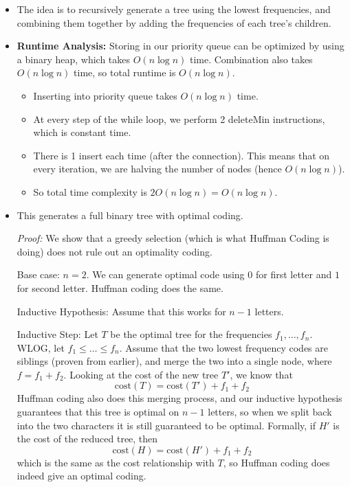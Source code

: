 	\begin{itemize}
		\item The idea is to recursively generate a tree using the lowest frequencies, and combining them 
			together by adding the frequencies of each tree's children. 
		\item \textbf{Runtime Analysis:} Storing in our priority queue can be optimized by using a binary heap, 
			which takes $O(n \log n)$ time. Combination also takes $O(n \log n)$ time, so total runtime
			 is $O(n \log n)$.
			\begin{itemize}
				\item Inserting into priority queue takes $O(n \log n)$ time. 
				\item At every step of the while loop, we perform 2 deleteMin instructions, which is constant
					time.
				\item There is 1 insert each time (after the connection). This means that on every 
					iteration, we are halving the number of nodes (hence $O(n \log n)$). 
				\item So total time complexity is $2O(n \log n) = O(n \log n)$.
			\end{itemize}
		 \item This generates a full binary tree with optimal coding. 

			 \textit{Proof:} We show that a greedy selection (which is what Huffman Coding is doing) does not 
			 rule out an optimality coding.

			Base case: $n = 2$. We can generate optimal code using $0$ for first letter and $1$ for 
			second letter. Huffman coding does the same.

			Inductive Hypothesis: Assume that this works for $n-1$ letters.

			Inductive Step: Let $T$ be the optimal tree for the frequencies $f_1, \dots, f_n$. WLOG, let 
			$f_1 \le \dots \le f_n$. Assume that the two lowest frequency codes are siblings (proven 
			from earlier), and merge the two into a single node, where $f = f_1 + f_2$. Looking at the cost 
			of the new tree $T'$, we know that 
			\[
				\mathrm{cost}(T) = \mathrm{cost}(T') + f_1 + f_2
			\] 
			Huffman coding also does this merging process, and our inductive hypothesis guarantees that this 
			tree is optimal on $n-1$ letters, so when we split back into the two characters it is still
			guaranteed to be optimal. Formally, if $H'$ is the cost of the reduced tree, then
			\[
				\mathrm{cost}(H) = \mathrm{cost}(H') + f_1 + f_2
			\] 
			which is the same as the cost relationship with $T$, so Huffman coding does indeed give an optimal 
			coding.
	\end{itemize}


